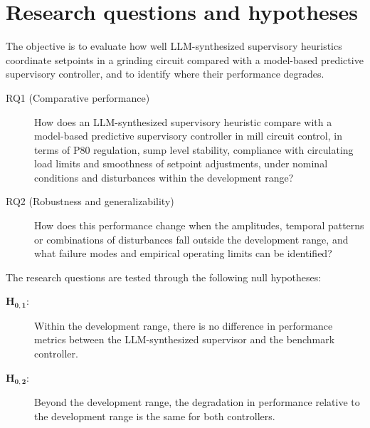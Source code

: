 \section{Research questions and hypotheses}
The objective is to evaluate how well LLM-synthesized supervisory heuristics
coordinate setpoints in a grinding circuit compared with a model-based
predictive supervisory controller, and to identify where their performance
degrades.
\begin{description}
\item[RQ1 (Comparative performance)] How does an LLM-synthesized supervisory
  heuristic compare with a model-based predictive supervisory controller in
  mill circuit control, in terms of P80 regulation, sump level stability,
  compliance with circulating load limits and smoothness of setpoint
  adjustments, under nominal conditions and disturbances within the
  development range?
\item[RQ2 (Robustness and generalizability)] How does this performance
  change when the amplitudes, temporal patterns or combinations of
  disturbances fall outside the development range, and what failure modes
  and empirical operating limits can be identified?
\end{description}
The research questions are tested through the following null hypotheses:
\begin{description}
\item[$\boldsymbol{H_{0,1}}$:] Within the development range, there is no
  difference in performance metrics between the LLM-synthesized supervisor
  and the benchmark controller.
\item[$\boldsymbol{H_{0,2}}$:] Beyond the development range, the degradation
  in performance relative to the development range is the same for both
  controllers.
\end{description}

